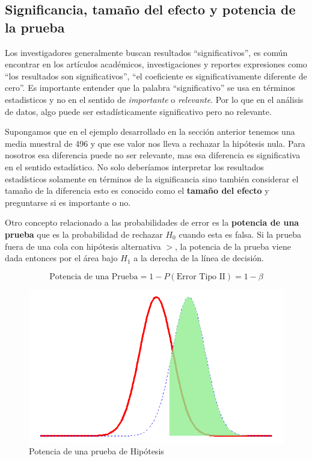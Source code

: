 \documentclass[
]{krantz}
\begin{document}
\hypertarget{significancia-tamano-del-efecto-y-potencia-de-la-prueba}{%
\subsection{Significancia, tamaño del efecto y potencia de la prueba}\label{significancia-tamano-del-efecto-y-potencia-de-la-prueba}}

Los investigadores generalmente buscan resultados ``significativos'', es común encontrar en los artículos académicos, investigaciones y reportes expresiones como ``los resultados son significativos'', ``el coeficiente es significativamente diferente de cero''. Es importante entender que la palabra ``significativo'' se usa en términos estadisticos y no en el sentido de \emph{importante} o \emph{relevante}. Por lo que en el análisis de datos, algo puede ser estadísticamente significativo pero no relevante.

Supongamos que en el ejemplo desarrollado en la sección anterior tenemos una media muestral de 496 y que ese valor nos lleva a rechazar la hipótesis nula. Para nosotros esa diferencia puede no ser relevante, mas esa diferencia es significativa en el sentido estadístico. No solo deberíamos interpretar los resultados estadísticos solamente en términos de la significancia sino también considerar el tamaño de la diferencia esto es conocido como el \textbf{tamaño del efecto} y preguntarse si es importante o no.

Otro concepto relacionado a las probabilidades de error es la \textbf{potencia de una prueba} que es la probabilidad de rechazar \(H_0\) cuando esta es falsa. Si la prueba fuera de una cola con hipótesis alternativa \(>\), la potencia de la prueba viene dada entonces por el área bajo \(H_1\) a la derecha de la línea de decisión.

\begin{equation} 
\text{Potencia de una Prueba}=1-P\left(\text{Error Tipo II}\right)=1-\beta
\label{eq:power}
\end{equation}

\begin{figure}[h!]

{\centering \includegraphics[width=0.6\linewidth]{power} 

}

\caption{Potencia de una prueba de Hipótesis}\label{fig:power}
\end{figure}
\end{document}
